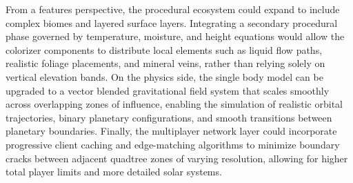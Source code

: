 \documentclass[12pt]{report}
\begin{document}
From a features perspective, the procedural ecosystem could expand to include complex biomes and layered surface layers. Integrating a secondary procedural phase governed by temperature, moisture, and height equations would allow the colorizer components to distribute local elements such as liquid flow paths, realistic foliage placements, and mineral veins, rather than relying solely on vertical elevation bands. On the physics side, the single body model can be upgraded to a vector blended gravitational field system that scales smoothly across overlapping zones of influence, enabling the simulation of realistic orbital trajectories, binary planetary configurations, and smooth transitions between planetary boundaries. Finally, the multiplayer network layer could incorporate progressive client caching and edge-matching algorithms to minimize boundary cracks between adjacent quadtree zones of varying resolution, allowing for higher total player limits and more detailed solar systems.

 

\end{document}
